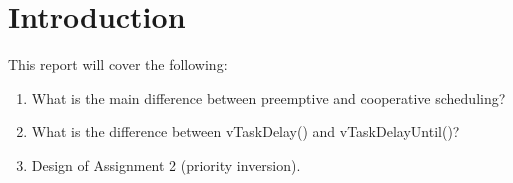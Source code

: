 \section{Introduction}
\label{section:intro}
This report will cover the following:
\begin{enumerate}
    \item What is the main difference between preemptive and cooperative scheduling? 
    \item What is the difference between vTaskDelay() and vTaskDelayUntil()? 
    \item Design of Assignment 2 (priority inversion).
\end{enumerate}
